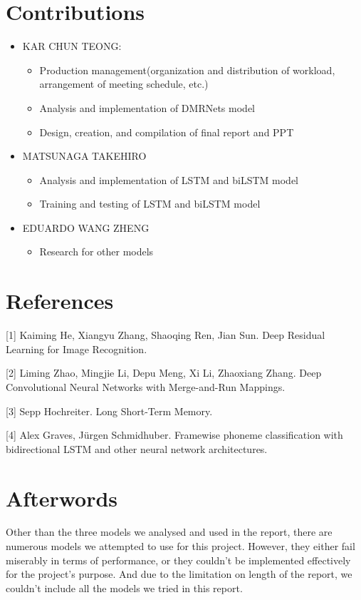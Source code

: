 \documentclass{article}
\begin{document}
\section{Contributions}
\begin{itemize}
\item KAR CHUN TEONG: 
\begin{itemize}
\item Production management(organization and distribution of workload, arrangement of meeting schedule, etc.)
\item Analysis and implementation of DMRNets model
\item Design, creation, and compilation of final report and PPT
\end{itemize}
\item MATSUNAGA TAKEHIRO
\begin{itemize}
\item Analysis and implementation of LSTM and biLSTM model
\item Training and testing of LSTM and biLSTM model
\end{itemize}
\item EDUARDO WANG ZHENG
\begin{itemize}
\item Research for other models
\end{itemize}
\end{itemize}

\section{References}
\medskip

\small

[1] Kaiming He, Xiangyu Zhang, Shaoqing Ren, Jian Sun. Deep Residual Learning for Image Recognition.

[2] Liming Zhao, Mingjie Li, Depu Meng, Xi Li, Zhaoxiang Zhang. Deep Convolutional Neural Networks with Merge-and-Run Mappings.

[3] Sepp Hochreiter. Long Short-Term Memory. 

[4] Alex Graves, Jürgen Schmidhuber. Framewise phoneme classification with bidirectional LSTM and other neural network architectures. 


\section{Afterwords}
Other than the three models we analysed and used in the report, there are numerous models we attempted to use for this project. However, they either fail miserably in terms of performance, or they couldn't be implemented effectively for the project's purpose. And due to the limitation on length of the report, we couldn't include all the models we tried in this report.
\end{document}
